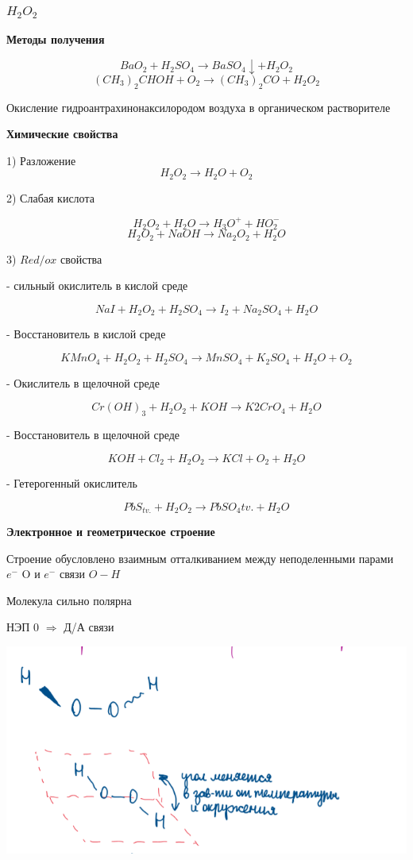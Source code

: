\subsubsection*{$H_2O_2$}

\textbf{Методы получения}

$$BaO_2 + H_2SO_4 \rightarrow BaSO_4\downarrow + H_2O_2$$
$$ (CH_3)_2CHOH + O_2 \rightarrow (CH_3)_2CO + H_2O_2$$

Окисление гидроантрахинонаксилородом воздуха в органическом растворителе

\textbf{Химические свойства}

1) Разложение
$$H_2O_2 \rightarrow H_2O + O_2$$

2) Слабая кислота

$$H_2O_2 + H_2O \rightarrow H_3O^+ + HO_2^-$$
$$H_2O_2 + NaOH \rightarrow Na_2O_2 + H_2O$$

3) $Red/ox$ свойства

- сильный окислитель в кислой среде

$$NaI + H_2O_2 + H_2SO_4 \rightarrow I_2 + Na_2SO_4 + H_2O$$

- Восстановитель в кислой среде

$$KMnO_4 + H_2O_2 + H_2SO_4 \rightarrow MnSO_4 + K_2SO_4 + H_2O + O_2$$

- Окислитель в щелочной среде

$$Cr(OH)_3 + H_2O_2 + KOH \rightarrow K2CrO_4 + H_2O$$

- Восстановитель в щелочной среде

$$KOH + Cl_2 + H_2O_2 \rightarrow KCl + O_2 + H_2O$$

- Гетерогенный окислитель

$$PbS_{tv.} + H_2O_2 \rightarrow PbSO_4{tv.} + H_2O$$

\textbf{Электронное и геометрическое строение}

Строение обусловлено взаимным отталкиванием между неподеленными парами $e^-$ O и $e^-$ связи $O-H$

Молекула сильно полярна

НЭП 0 $\Rightarrow$ Д/А связи

\includegraphics[scale=0.95]{images/6v3.png}

